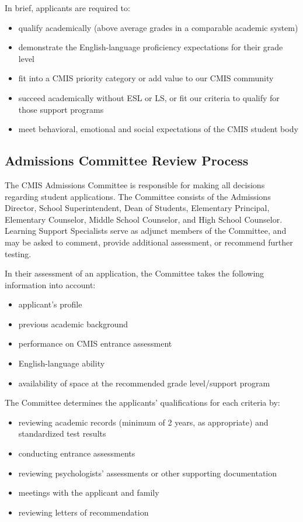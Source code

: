 In brief, applicants are required to:

\begin{itemize}
\item qualify academically (above average grades in a comparable academic system)
\item demonstrate the English-language proficiency expectations for their grade level
\item fit into a CMIS priority category or add value to our CMIS community
\item succeed academically without ESL or LS, or fit our criteria to qualify for those support programs
\item meet behavioral, emotional and social expectations of the CMIS student body
\end{itemize}

\subsection{Admissions Committee Review Process}

The CMIS Admissions Committee is responsible for making all decisions regarding student applications. The Committee consists of the Admissions Director, School Superintendent, Dean of Students, Elementary Principal, Elementary Counselor, Middle School Counselor, and High School Counselor.    Learning Support Specialists serve as adjunct members of the Committee, and may be asked to comment, provide additional assessment, or recommend further testing.  

In their assessment of an application, the Committee takes the following information into account:

\begin{itemize}
\item applicant's profile
\item previous academic background
\item performance on CMIS entrance assessment
\item English-language ability
\item availability of space at the recommended grade level/support program
\end{itemize}

The Committee determines the applicants’ qualifications for each criteria by:

\begin{itemize}
\item reviewing academic records (minimum of 2 years, as appropriate) and standardized test results
\item conducting entrance assessments
\item reviewing psychologists' assessments or other supporting documentation
\item meetings with the applicant and family
\item reviewing letters of recommendation
\end{itemize}

